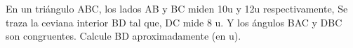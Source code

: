 En un triángulo ABC, los lados AB y BC miden 10u y 12u respectivamente, Se traza la ceviana interior BD tal que, DC mide 8 u. Y los ángulos BAC y DBC son congruentes. Calcule BD aproximadamente (en u).


